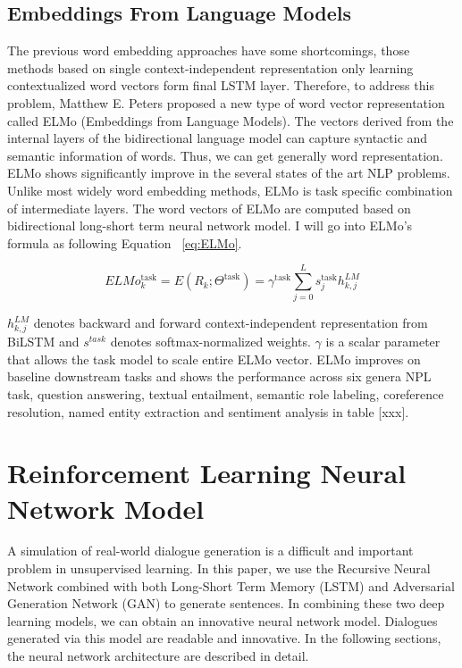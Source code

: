 \subsection{Embeddings From Language Models}
The previous word embedding approaches have some shortcomings, those methods based on single context-independent representation only learning contextualized word vectors form final LSTM layer. Therefore, to address this problem, Matthew E. Peters \etal proposed a new type of word vector representation called ELMo \cite{ELMo} (Embeddings from Language Models). The vectors derived from the internal layers of the bidirectional language model can capture syntactic and semantic information of words. Thus, we can get generally word representation. ELMo shows significantly improve in the several states of the art NLP problems. Unlike most widely word embedding methods, ELMo is task specific combination of intermediate layers. The word vectors of ELMo are computed based on bidirectional long-short term neural network model. I will go into ELMo’s formula as following Equation ~\ref{eq:ELMo}.

\begin{equation} \label{eq:ELMo}
E L M o_{k}^{\operatorname{task}}=E\left(R_{k} ; \Theta^{\operatorname{task}}\right)=\gamma^{\operatorname{task}} \sum_{j=0}^{L} s_{j}^{\operatorname{task}} h_{k, j}^{L M}
\end{equation}

$h_{k, j}^{L M}$ denotes backward and forward context-independent representation from BiLSTM and $s^{t a s k}$ denotes softmax-normalized weights. $\gamma$ is a scalar parameter that allows the task model to scale entire ELMo vector. ELMo improves on baseline downstream tasks and shows the performance across six genera NPL task, question answering, textual entailment, semantic role labeling, coreference resolution, named entity extraction and sentiment analysis in table [xxx].

\section{Reinforcement Learning Neural Network Model}

A simulation of real-world dialogue generation is a difficult and important problem in unsupervised learning. In this paper, we use the Recursive Neural Network combined with both Long-Short Term Memory (LSTM) \cite{LSTM} and Adversarial Generation Network (GAN)\cite{Adversarial_Learning_for_Neural_Dialogue_Generation} to generate sentences. In combining these two deep learning models, we can obtain an innovative neural network model. Dialogues generated via this model are readable and innovative. In the following sections, the neural network architecture are described in detail.

